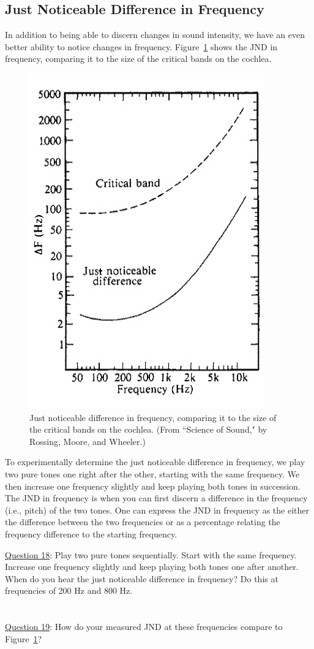 \documentclass[11pt]{NSF}
\begin{document}
\subsection{Just Noticeable Difference in Frequency}

In addition to being able to discern changes in sound intensity, 
we have an even better ability to notice changes in frequency. 
Figure~\ref{f:jnd_pitch} shows the JND in frequency, comparing 
it to the size of the critical bands on the cochlea.
%
\begin{figure}[hbtp]
\begin{center}
\includegraphics[width=.4\textwidth]{freqJNDa.jpg}
\caption{Just noticeable difference in frequency,
comparing it to the size of the critical bands on the cochlea.
(From ``Science of Sound," by Rossing, Moore, and Wheeler.)}
\label{f:jnd_pitch}
\end{center}
\end{figure}
%

To experimentally determine the just noticeable difference in
frequency, we play two pure tones one right after the other,
starting with the same frequency. 
We then increase one frequency slightly and keep playing both tones 
in succession.
The JND in frequency is when you can first discern a difference in 
the frequency (i.e., pitch) of the two tones.
One can express the JND in frequency as the either the 
difference between the two frequencies or as a percentage relating
the frequency difference to the starting frequency.

\underline{Question 18}: Play two pure tones sequentially. Start with the same frequency. Increase one frequency
slightly and keep playing both tones one after another. When do you hear the just noticeable
difference in frequency? Do this at frequencies of 200 Hz and 800 Hz.
\\
\\
\\

\underline{Question 19}: How do your measured JND at these frequencies compare to Figure~\ref{f:jnd_pitch}?
\\
\\
\\
\end{document}
